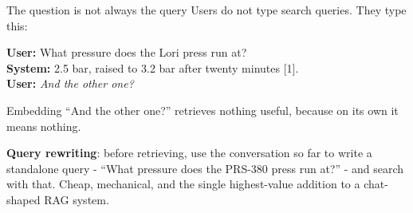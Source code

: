 \documentclass[aspectratio=169]{beamer}
\newcommand{\keybox}[1]{%
  \begin{tcolorbox}[colback=armblue!8, colframe=armblue, boxrule=0.6pt, arc=2pt]
  #1
  \end{tcolorbox}}
\begin{document}
\begin{frame}{The question is not always the query}
  \vspace{0.3em}
  Users do not type search queries. They type this:

  \vspace{0.35em}
  \begin{center}
  \begin{tcolorbox}[colback=lightbg, colframe=gray, boxrule=0.5pt, arc=2pt, width=0.9\textwidth]
    \small
    \textbf{User:} What pressure does the Lori press run at?\\
    \textbf{System:} 2.5 bar, raised to 3.2 bar after twenty minutes [1].\\
    \textbf{User:} \textit{And the other one?}
  \end{tcolorbox}
  \end{center}

  \vspace{0.4em}
  Embedding ``And the other one?'' retrieves nothing useful, because on its own it means
  nothing.

  \vspace{0.4em}
  \keybox{\textbf{Query rewriting}: before retrieving, use the conversation so far to write
  a standalone query - ``What pressure does the PRS-380 press run at?'' - and search with
  that. Cheap, mechanical, and the single highest-value addition to a chat-shaped RAG
  system.}
\end{frame}
\end{document}
